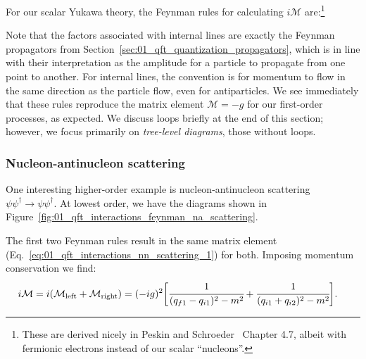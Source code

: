 \begin{definition}
For our scalar Yukawa theory, the Feynman rules for calculating $i\mathcal M$ are:\footnote{These are derived nicely in Peskin and Schroeder~\cite{Peskin:1995ev} Chapter 4.7, albeit with fermionic electrons instead of our scalar ``nucleons''.}

\end{definition}
Note that the factors associated with internal lines are exactly the Feynman propagators from Section~\ref{sec:01_qft_quantization_propagators}, which is in line with their interpretation as the amplitude for a particle to propagate from one point to another.
For internal lines, the convention is for momentum to flow in the same direction as the particle flow, even for antiparticles.
We see immediately that these rules reproduce the matrix element $\mathcal M = -g$ for our first-order processes, as expected.
We discuss loops briefly at the end of this section; however, we focus primarily on \textit{tree-level diagrams}, those without loops.

\subsubsection{Nucleon-antinucleon scattering}

One interesting higher-order example is nucleon-antinucleon scattering $\psi\psi^\dagger \rightarrow \psi\psi^\dagger$.
At lowest order, we have the diagrams shown in Figure~\ref{fig:01_qft_interactions_feynman_na_scattering}.



The first two Feynman rules result in the same matrix element (Eq.~\ref{eq:01_qft_interactions_nn_scattering_1}) for both.
Imposing momentum conservation we find:
\begin{equation}
	\label{eq:01_qft_interactions_na_scattering}
	\begin{split}
		i \mathcal M = i(\mathcal M_{\mathrm{left}} + \mathcal M_{\mathrm{right}}) &= (-ig)^2 \bigg[ \cfrac{1}{(q_{f1} - q_{i1})^2 - m^2} + \cfrac{1}{(q_{i1} + q_{i2})^2 - m^2} \bigg]. 
	\end{split}
\end{equation}



